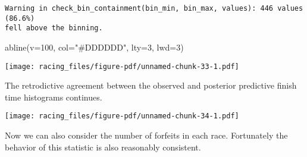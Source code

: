 \documentclass[
  letterpaper,
  DIV=11,
  numbers=noendperiod]{scrartcl}
\newenvironment{Shaded}{\begin{snugshade}}{\end{snugshade}}
\newcommand{\AttributeTok}[1]{\textcolor[rgb]{0.40,0.45,0.13}{#1}}
\newcommand{\DecValTok}[1]{\textcolor[rgb]{0.68,0.00,0.00}{#1}}
\newcommand{\FunctionTok}[1]{\textcolor[rgb]{0.28,0.35,0.67}{#1}}
\newcommand{\NormalTok}[1]{\textcolor[rgb]{0.00,0.23,0.31}{#1}}
\newcommand{\SpecialCharTok}[1]{\textcolor[rgb]{0.37,0.37,0.37}{#1}}
\newcommand{\StringTok}[1]{\textcolor[rgb]{0.13,0.47,0.30}{#1}}
\begin{document}
\begin{verbatim}
Warning in check_bin_containment(bin_min, bin_max, values): 446 values (86.6%)
fell above the binning.
\end{verbatim}

\begin{Shaded}
\begin{Highlighting}[]
\FunctionTok{abline}\NormalTok{(}\AttributeTok{v=}\DecValTok{100}\NormalTok{, }\AttributeTok{col=}\StringTok{"\#DDDDDD"}\NormalTok{, }\AttributeTok{lty=}\DecValTok{3}\NormalTok{, }\AttributeTok{lwd=}\DecValTok{3}\NormalTok{)}
\end{Highlighting}
\end{Shaded}

\texttt{[image: racing\_files/figure-pdf/unnamed-chunk-33-1.pdf]}

The retrodictive agreement between the observed and posterior predictive
finish time histograms continues.

\begin{Shaded}
\end{Shaded}

\texttt{[image: racing\_files/figure-pdf/unnamed-chunk-34-1.pdf]}

Now we can also consider the number of forfeits in each race.
Fortunately the behavior of this statistic is also reasonably
consistent.
\end{document}
